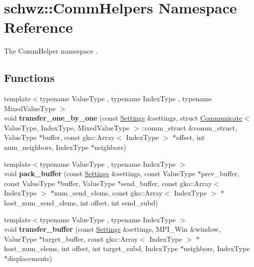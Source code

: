 \hypertarget{namespaceschwz_1_1CommHelpers}{}\section{schwz\+:\+:Comm\+Helpers Namespace Reference}
\label{namespaceschwz_1_1CommHelpers}


The Comm\+Helper namespace .  


\subsection*{Functions}
\begin{DoxyCompactItemize}
\item 
\mbox{\label{namespaceschwz_1_1CommHelpers_a4ee2d6f849aca5761ce6e04093a37ff2}} 
{\footnotesize template$<$typename Value\+Type , typename Index\+Type , typename Mixed\+Value\+Type $>$ }\\void {\bfseries transfer\+\_\+one\+\_\+by\+\_\+one} (const \hyperlink{structschwz_1_1Settings}{Settings} \&settings, struct \hyperlink{classschwz_1_1Communicate}{Communicate}$<$ Value\+Type, Index\+Type, Mixed\+Value\+Type $>$\+::comm\+\_\+struct \&comm\+\_\+struct, Value\+Type $\ast$buffer, const gko\+::\+Array$<$ Index\+Type $>$ $\ast$offset, int num\+\_\+neighbors, Index\+Type $\ast$neighbors)
\item 
\mbox{\label{namespaceschwz_1_1CommHelpers_a48a1cfb624582a1b615141b5253d6093}} 
{\footnotesize template$<$typename Value\+Type , typename Index\+Type $>$ }\\void {\bfseries pack\+\_\+buffer} (const \hyperlink{structschwz_1_1Settings}{Settings} \&settings, const Value\+Type $\ast$prev\+\_\+buffer, const Value\+Type $\ast$buffer, Value\+Type $\ast$send\+\_\+buffer, const gko\+::\+Array$<$ Index\+Type $>$ $\ast$num\+\_\+send\+\_\+elems, const gko\+::\+Array$<$ Index\+Type $>$ $\ast$host\+\_\+num\+\_\+send\+\_\+elems, int offset, int send\+\_\+subd)
\item 
\mbox{\label{namespaceschwz_1_1CommHelpers_a773ca780c5e14978e260b63500e58194}} 
{\footnotesize template$<$typename Value\+Type , typename Index\+Type $>$ }\\void {\bfseries transfer\+\_\+buffer} (const \hyperlink{structschwz_1_1Settings}{Settings} \&settings, M\+P\+I\+\_\+\+Win \&window, Value\+Type $\ast$target\+\_\+buffer, const gko\+::\+Array$<$ Index\+Type $>$ $\ast$host\+\_\+num\+\_\+elems, int offset, int target\+\_\+subd, Index\+Type $\ast$neighbors, Index\+Type $\ast$displacements)

\end{DoxyCompactItemize}
